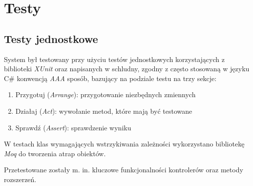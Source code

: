 \documentclass[eng,printmode,openany]{mgr}
\begin{document}
	
	\newpage
	\chapter{Testy}
	\section{Testy jednostkowe}
	System był testowany przy użyciu testów jednostkowych korzystających z biblioteki \textit{XUnit} oraz napisanych w schludny, zgodny z często stosowaną w języku C\# konwencją \textit{AAA} sposób, bazujący na podziale testu na trzy sekcje:
	\begin{enumerate}
		\item Przygotuj (\textit{Arrange}): przygotowanie niezbędnych zmiennych
		\item Działaj (\textit{Act}): wywołanie metod, które mają być testowane
		\item Sprawdź (\textit{Assert}): sprawdzenie wyniku
	\end{enumerate}
	W testach klas wymagających wstrzykiwania zależności wykorzystano bibliotekę \textit{Moq} do tworzenia atrap obiektów.
	
	Przetestowane zostały m. in. kluczowe funkcjonalności kontrolerów oraz metody rozszerzeń.
	
	
	\newpage
	
	
	\newpage
\end{document}
